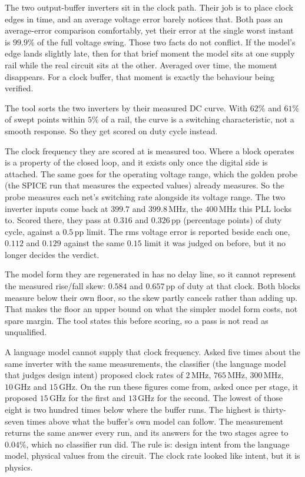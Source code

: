 \documentclass[11pt,a4paper]{article}
\newcommand{\unit}[1]{\,\textrm{#1}}
\begin{document}
The two output-buffer inverters sit in the clock path. Their job is
to place clock edges in time, and an average voltage error barely
notices that. Both pass an average-error comparison comfortably, yet
their error at the single worst instant is $99.9\%$ of the full
voltage swing. Those two facts do not conflict. If the model's edge
lands slightly late, then for that brief moment the model sits at one
supply rail while the real circuit sits at the other. Averaged over
time, the moment disappears. For a clock buffer, that moment is
exactly the behaviour being verified.

The tool sorts the two inverters by their measured DC curve. With
$62\%$ and $61\%$ of swept points within $5\%$ of a rail, the curve is
a switching characteristic, not a smooth response. So they get scored
on duty cycle instead.

The clock frequency they are scored at is measured too. Where a block
operates is a property of the closed loop, and it exists only once the
digital side is attached. The same goes for the operating voltage
range, which the golden probe (the SPICE run that measures the
expected values) already measures. So the probe measures each net's
switching rate alongside its voltage range. The two inverter inputs
come back at $399.7$ and $399.8\unit{MHz}$, the $400\unit{MHz}$ this
PLL locks to. Scored there, they pass at $0.316$ and
$0.326\unit{pp}$ (percentage points) of duty cycle, against a
$0.5\unit{pp}$ limit. The rms voltage error is reported beside each
one, $0.112$ and $0.129$ against the same $0.15$ limit it was judged
on before, but it no longer decides the verdict.

The model form they are regenerated in has no delay line, so it cannot
represent the measured rise/fall skew: $0.584$ and $0.657\unit{pp}$ of
duty at that clock. Both blocks measure below their own floor, so the
skew partly cancels rather than adding up. That makes the floor an
upper bound on what the simpler model form costs, not spare margin.
The tool states this before scoring, so a pass is not read as
unqualified.

A language model cannot supply that clock frequency. Asked five times
about the same inverter with the same measurements, the classifier
(the language model that judges design intent) proposed clock rates of
$2\unit{MHz}$, $765\unit{MHz}$, $300\unit{MHz}$, $10\unit{GHz}$ and
$15\unit{GHz}$. On the run these figures come from, asked once per
stage, it proposed $15\unit{GHz}$ for the first and $13\unit{GHz}$ for
the second. The lowest of those eight is two hundred times below where
the buffer runs. The highest is thirty-seven times above what the
buffer's own model can follow. The measurement returns the same answer
every run, and its answers for the two stages agree to $0.04\%$, which
no classifier run did. The rule is: design intent from the language
model, physical values from the circuit. The clock rate looked like
intent, but it is physics.
\end{document}
